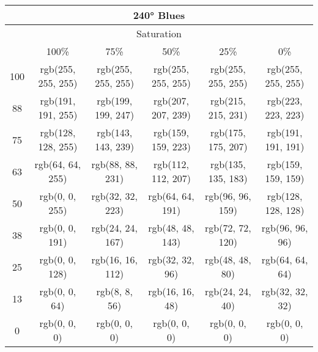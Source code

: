 \documentclass[a4j]{jarticle}
\begin{document}
\begin{tabular}{|c|c|c|c|c|c|}
\multicolumn{6}{|c|}{240°
 Blues}\\\hline\multicolumn{6}{|c|}{Saturation}\\\hline&100\%&75\%&50\%&25\%&0\%\\\hline100&rgb(255,
     255, 255)&rgb(255, 255, 255)&rgb(255, 255, 255)&rgb(255, 255,
                 255)&rgb(255, 255, 255)\\\hline88&rgb(191, 191,
     255)&rgb(199, 199, 247)&rgb(207, 207, 239)&rgb(215, 215,
                 231)&rgb(223, 223, 223)\\\hline75&rgb(128, 128,
     255)&rgb(143, 143, 239)&rgb(159, 159, 223)&rgb(175, 175,
                 207)&rgb(191, 191, 191)\\\hline63&rgb(64, 64,
     255)&rgb(88, 88, 231)&rgb(112, 112, 207)&rgb(135, 135,
                 183)&rgb(159, 159, 159)\\\hline50&rgb(0, 0,
     255)&rgb(32, 32, 223)&rgb(64, 64, 191)&rgb(96, 96, 159)&rgb(128,
                     128, 128)\\\hline38&rgb(0, 0, 191)&rgb(24, 24,
         167)&rgb(48, 48, 143)&rgb(72, 72, 120)&rgb(96, 96,
                     96)\\\hline25&rgb(0, 0, 128)&rgb(16, 16,
         112)&rgb(32, 32, 96)&rgb(48, 48, 80)&rgb(64, 64,
                     64)\\\hline13&rgb(0, 0, 64)&rgb(8, 8, 56)&rgb(16,
             16, 48)&rgb(24, 24, 40)&rgb(32, 32, 32)\\\hline0&rgb(0, 0,
     0)&rgb(0, 0, 0)&rgb(0, 0, 0)&rgb(0, 0, 0)&rgb(0, 0, 0) 
\end{tabular}
\end{document}

